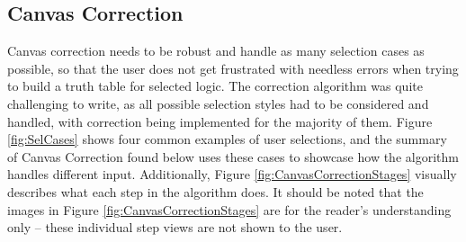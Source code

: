 \subsection{Canvas Correction}
Canvas correction needs to be robust and handle as many selection cases as possible, so that the user does not get frustrated with needless errors when trying to build a truth table for selected logic. The correction algorithm was quite challenging to write, as all possible selection styles had to be considered and handled, with correction being implemented for the majority of them.
Figure \ref{fig:SelCases} shows four common examples of user selections, and the summary of Canvas Correction found below uses these cases to showcase how the algorithm handles different input. Additionally, Figure \ref{fig:CanvasCorrectionStages} visually describes what each step in the algorithm does. It should be noted that the images in Figure \ref{fig:CanvasCorrectionStages} are for the reader's understanding only -- these individual step views are not shown to the user.
